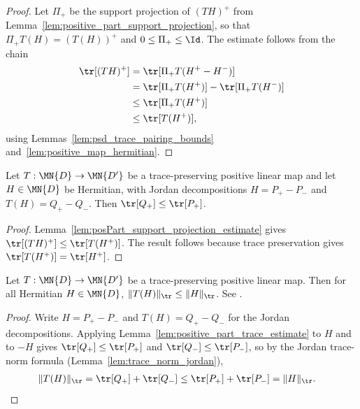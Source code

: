 \begin{proof}\leanok
    Let $\Pi_+$ be the support projection of $(TH)^+$ from
    Lemma~\ref{lem:positive_part_support_projection}, so that
    $\Pi_+ T(H) = (T(H))^+$ and $0\leq\Pi_+\leq\Id$.  The estimate follows
    from the chain
    \begin{align}
        \tr[(TH)^+] &= \tr[\Pi_+ T(H^+-H^-)] \notag\\
        &= \tr[\Pi_+ T(H^+)] - \tr[\Pi_+ T(H^-)] \notag\\
        &\leq \tr[\Pi_+ T(H^+)] \notag\\
        &\leq \tr[T(H^+)] ,
    \end{align}
    using Lemmas~\ref{lem:psd_trace_pairing_bounds}
    and~\ref{lem:positive_map_hermitian}.
\end{proof}

\begin{lemma}
    \label{lem:positive_part_trace_estimate}
    \leanok
    Let $T:\MN{D}\to\MN{D'}$ be a trace-preserving positive linear map and
    let $H\in\MN{D}$ be Hermitian, with Jordan decompositions $H=P_+-P_-$
    and $T(H)=Q_+-Q_-$. Then $\tr[Q_+]\leq\tr[P_+]$.
\end{lemma}

\begin{proof}\leanok
    Lemma~\ref{lem:posPart_support_projection_estimate} gives
    $\tr[(TH)^+]\leq\tr[T(H^+)]$.  The result follows because
    trace preservation gives $\tr[T(H^+)]=\tr[H^+]$.
\end{proof}

\begin{theorem}
    \label{thm:trace_norm_contractivity}
    \leanok
    Let $T:\MN{D}\to\MN{D'}$ be a trace-preserving positive linear map.
    Then for all Hermitian $H\in\MN{D}$,
    $\lVert T(H)\rVert_{\tr}\leq\lVert H\rVert_{\tr}$.
    See \cite[Chapter~8, Theorem~8.16]{Wolf2012Quantum}.
\end{theorem}

\begin{proof}\leanok
    Write $H=P_+-P_-$ and $T(H)=Q_+-Q_-$ for the Jordan decompositions.
    Applying Lemma~\ref{lem:positive_part_trace_estimate} to $H$ and to
    $-H$ gives $\tr[Q_+]\leq\tr[P_+]$ and
    $\tr[Q_-]\leq\tr[P_-]$, so by the Jordan
    trace-norm formula (Lemma~\ref{lem:trace_norm_jordan}),
    \begin{align}
        \lVert T(H)\rVert_{\tr}
        &=\tr[Q_+]+\tr[Q_-]
          \leq\tr[P_+]+\tr[P_-]
          =\lVert H\rVert_{\tr}.
        \notag
    \end{align}
\end{proof}

